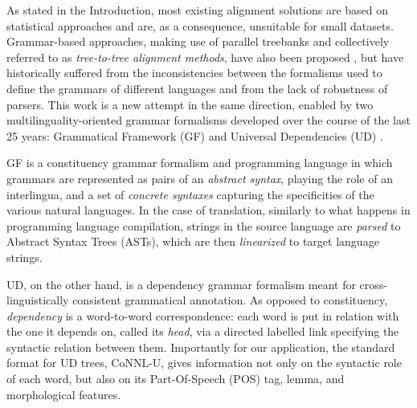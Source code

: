 \documentclass[11pt]{article}
\begin{document}
As stated in the Introduction, most existing alignment solutions are based on statistical approaches and are, as a consequence, unsuitable for small datasets. 
Grammar-based approaches, making use of parallel treebanks and collectively referred to as \textit{tree-to-tree alignment methods}, have also been proposed \cite{tiedemann2011bitext}, but have historically suffered from the inconsistencies between the formalisms used to define the grammars of different languages and from the lack of robustness of parsers.
This work is a new attempt in the same direction, enabled by two multilinguality-oriented grammar formalisms developed over the course of the last 25 years: Grammatical Framework (GF) \cite{ranta-2011} and Universal Dependencies (UD) \cite{ws-2019-universal}.

GF is a constituency grammar formalism and programming language in which grammars are represented as pairs of an \textit{abstract syntax}, playing the role of an interlingua, and a set of \textit{concrete syntaxes} capturing the specificities of the various natural languages. 
In the case of translation, similarly to what happens in programming language compilation, strings in the source language are \textit{parsed} to Abstract Syntax Trees (ASTs), which are then \textit{linearized} to target language strings.

UD, on the other hand, is a dependency grammar formalism meant for cross-linguistically consistent grammatical annotation.
As opposed to constituency, \textit{dependency} is a word-to-word correspondence: each word is put in relation with the one it depends on, called its \textit{head}, via a directed labelled link specifying the syntactic relation between them.
Importantly for our application, the standard format for UD trees, CoNNL-U, gives information not only on the syntactic role of each word, but also on its Part-Of-Speech (POS) tag, lemma, and morphological features.  
\end{document}

